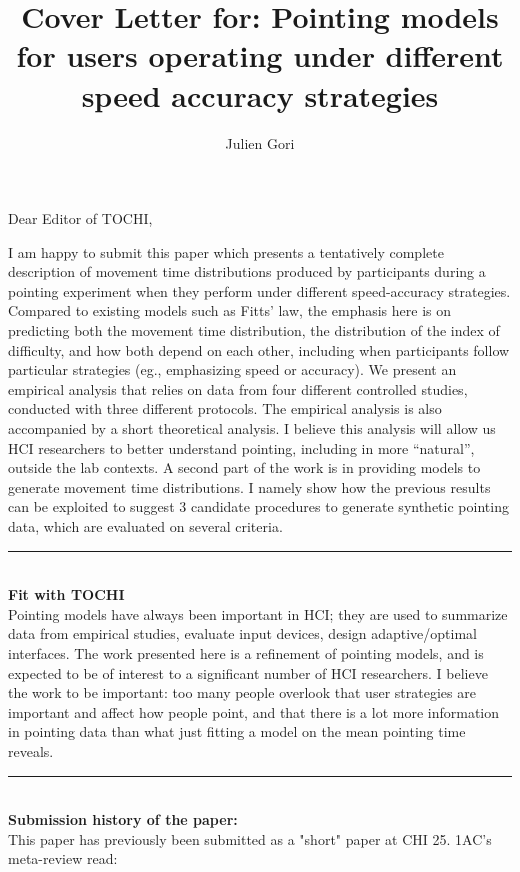 \documentclass{article}
\title{Cover Letter for: Pointing models for users operating under different speed accuracy strategies}
\author{Julien Gori}
\begin{document}
\maketitle


Dear Editor of TOCHI, 

\vspace{2\baselineskip}


I am happy to submit this paper which presents a tentatively complete description of movement time distributions produced by participants during a pointing experiment when they perform under different speed-accuracy strategies. 
Compared to existing models such as Fitts' law, the emphasis here is on predicting both the movement time distribution, the distribution of the index of difficulty, and how both depend on each other, including when participants follow particular strategies (eg., emphasizing speed or accuracy). We present an empirical analysis that relies on data from four different controlled studies, conducted with three different protocols. The empirical analysis is also accompanied by a short theoretical analysis. I believe this analysis will allow us HCI researchers to better understand pointing, including in more ``natural'', outside the lab contexts.
A second part of the work is in providing models to generate movement time distributions. I namely show how the previous results can be exploited to suggest 3 candidate procedures to generate synthetic pointing data, which are evaluated on several criteria. 


\noindent\rule{\textwidth}{0.4pt}\\
\textbf{Fit with TOCHI}\\
Pointing models have always been important in HCI; they are used to summarize data from empirical studies, evaluate input devices, design adaptive/optimal interfaces. The work presented here is a refinement of pointing models, and is expected to be of interest to a significant number of HCI researchers.
I believe the work to be important: too many people overlook that user strategies are important and affect how people point, and that there is a lot more information in pointing data than what just fitting a model on the mean pointing time reveals.



\noindent\rule{\textwidth}{0.4pt}\\
\textbf{Submission history of the paper:}\\
This paper has previously been submitted as a "short" paper at CHI 25. 1AC's meta-review read:
\end{document}
